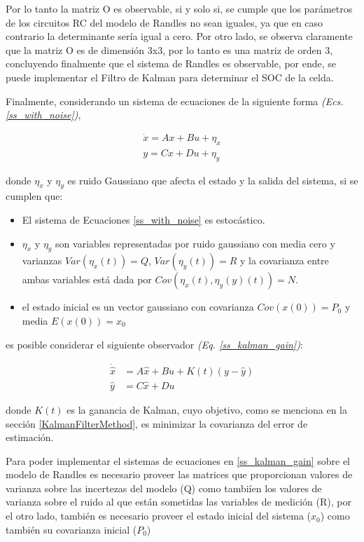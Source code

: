 \documentclass[10pt,a4paper]{article}
\begin{document}
Por lo tanto la matriz O es observable, si y solo si, se cumple que los
par\'ametros de los circuitos RC del modelo de Randles no sean iguales, ya que
en caso contrario la determinante ser\'ia igual a cero. Por otro lado, se observa
claramente que la matriz O es de dimensi\'on 3x3, por lo tanto es una matriz de
orden 3, concluyendo finalmente que el sistema de Randles es observable, por 
ende, se puede implementar el Filtro de Kalman para determinar el \acrshort{SOC} 
de la celda.

Finalmente, considerando un sistema de ecuaciones de la siguiente forma \emph{(Ecs.
\ref{ss_with_noise})},

\begin{align}
    \dot{x} = Ax + Bu + \eta_x\nonumber\\
    y = Cx + Du + \eta_y\label{ss_with_noise}
\end{align}

donde $\eta_x$ y $\eta_y$ es ruido Gaussiano que afecta el estado y la salida
del sistema, si se cumplen que:

\begin{itemize}
    \item El sistema de Ecuaciones \ref{ss_with_noise} es estoc\'astico.
    \item $\eta_x$ y $\eta_y$ son variables representadas por ruido gaussiano
        con media cero y varianzas $Var\left(\eta_x(t)\right) = Q$,
        $Var\left(\eta_y(t)\right) = R$ y la covarianza entre ambas variables
        est\'a dada por $Cov\left(\eta_x(t), \eta_y(y)(t)\right) = N$.
    \item el estado inicial es un vector gaussiano con covarianza
        $Cov\left(x(0)\right) = P_0$ y media $E\left(x(0)\right) = x_0$
\end{itemize}

es posible considerar el siguiente observador \emph{(Eq. \ref{ss_kalman_gain})}:

\begin{align}
    \dot{\hat{x}} &= A\hat{x} + Bu + K(t)(y - \hat{y})\nonumber\\
    \hat{y} &= C\hat{x} + Du \label{ss_kalman_gain}
\end{align}

donde $K(t)$ es la ganancia de Kalman, cuyo objetivo, como se menciona en la
secci\'on \ref{KalmanFilterMethod}, es minimizar la covarianza del error de
estimaci\'on. 

\newpage

Para poder implementar el sistemas de ecuaciones en \ref{ss_kalman_gain} sobre
el modelo de Randles es necesario proveer las matrices que proporcionan valores 
de varianza sobre las incertezas del modelo (Q) como tambi\'ien los valores de
varianza sobre el ruido al que est\'an sometidas las variables de medici\'on
(R), por el otro lado, tambi\'en es necesario proveer el estado inicial del
sistema ($x_0$) como tambi\'en su covarianza inicial ($P_0$)
\end{document}
